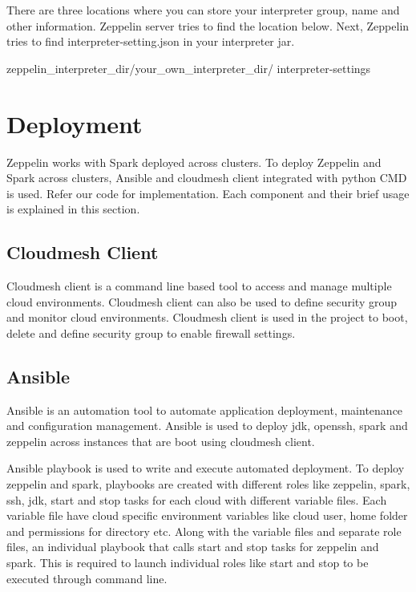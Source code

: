 \documentclass[9pt,twocolumn,twoside]{../../styles/osajnl}
\begin{document}
	There are three locations where you can store your interpreter 
	group, 
	name and other information. Zeppelin server tries to find the 
	location below. Next, Zeppelin tries to find 
	interpreter-setting.json 
	in your interpreter jar.
	
	zeppelin\_interpreter\_dir/your\_own\_interpreter\_dir/
	interpreter-settings
	
	\section{Deployment}
	
	Zeppelin works with Spark deployed across clusters. To deploy 
	Zeppelin
	and Spark across clusters, Ansible and cloudmesh client integrated
	with python CMD is used. Refer our code for implementation. Each
	component and their brief usage is explained in this section.
	
	\subsection{Cloudmesh Client}
	
	Cloudmesh client is a command line based tool to access and manage
	multiple cloud environments. Cloudmesh client can also be used to
	define security group and monitor cloud environments. Cloudmesh 
	client
	is used in the project to boot, delete and define security group 
	to
	enable firewall settings.
	
	\subsection{Ansible}
	
	Ansible is an automation tool to automate application deployment,
	maintenance and configuration management. Ansible is used to 
	deploy
	jdk, openssh, spark and zeppelin across instances that are boot 
	using
	cloudmesh client.
	
	Ansible playbook is used to write and execute automated 
	deployment. To
	deploy zeppelin and spark, playbooks are created with different 
	roles
	like zeppelin, spark, ssh, jdk, start and stop tasks for each 
	cloud with different
	variable files. Each variable file have cloud specific environment
	variables like cloud user, home folder and permissions for 
	directory
	etc. Along with the variable files and separate role files, an 
	individual playbook that calls start and stop tasks for zeppelin 
	and spark. 
	This
	is required to launch individual roles like start and stop to be
	executed through command line. 
	
\end{document}
